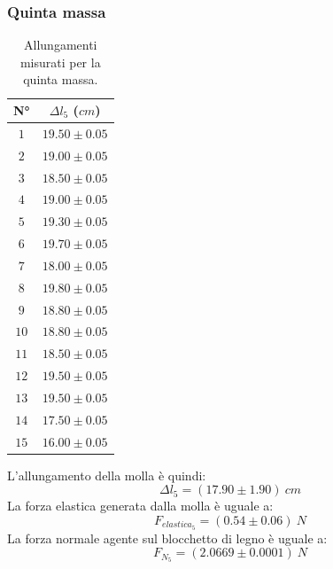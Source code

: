 \documentclass[11pt]{article}
\begin{document}
\subsubsection{Quinta massa}
\begin{table}[H]
\centering
\begin{tabular}{|c|c|}
\hline
\textbf{N°} & \textbf{$\Delta l_5$ ($cm$)}\\
\hline
$1$ & $19.50\pm 0.05$ \\
\hline
$2$ & $19.00\pm 0.05$ \\
\hline
$3$ & $18.50\pm 0.05$ \\
\hline
$4$ & $19.00\pm 0.05$ \\
\hline
$5$ & $19.30\pm 0.05$ \\
\hline
$6$ & $19.70\pm 0.05$ \\
\hline
$7$ & $18.00\pm 0.05$ \\
\hline
$8$ & $19.80\pm 0.05$ \\
\hline
$9$ & $18.80\pm 0.05$ \\
\hline
$10$ & $18.80\pm 0.05$ \\
\hline
$11$ & $18.50\pm 0.05$ \\
\hline
$12$ & $19.50\pm 0.05$ \\
\hline
$13$ & $19.50\pm 0.05$ \\
\hline
$14$ & $17.50\pm 0.05$ \\
\hline
$15$ & $16.00\pm 0.05$ \\
\hline
\end{tabular}
\caption{Allungamenti misurati per la quinta massa.}
\label{tab:}
\end{table}
L'allungamento della molla è quindi:
\begin{equation}
    \Delta l_5=(17.90\pm 1.90)\ cm
\end{equation}
La forza elastica generata dalla molla è uguale a:
\begin{equation}
    F_{elastica_5} = (0.54\pm 0.06)\ N
\end{equation}
La forza normale agente sul blocchetto di legno è uguale a:
\begin{equation}
    F_{N_5} = (2.0669\pm 0.0001)\ N
\end{equation}
\end{document}
